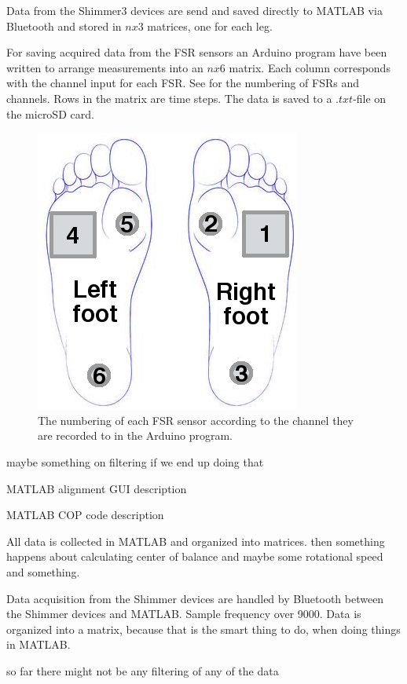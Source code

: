 Data from the Shimmer3 devices are send and saved directly to MATLAB via Bluetooth and stored in $nx3$ matrices, one for each leg.

For saving acquired data from the FSR sensors an Arduino program have been written to arrange measurements into an $nx6$ matrix. Each column corresponds with the channel input for each FSR. See  for the numbering of FSRs and channels. Rows in the matrix are time steps. The data is saved to a $.txt$-file on the microSD card. 

\begin{figure}[H]
	\includegraphics[width=.6\textwidth]{figures/FSRNumbering}
	\caption{The numbering of each FSR sensor according to the channel they are recorded to in the Arduino program.}
	\label{fig:FSRNumbering}  %
\end{figure}

maybe something on filtering if we end up doing that

MATLAB alignment GUI description

MATLAB COP code description





All data is collected in MATLAB and organized into matrices. then something happens about calculating center of balance and maybe some rotational speed and something. 

Data acquisition from the Shimmer devices are handled by Bluetooth between the Shimmer devices and MATLAB. Sample frequency over 9000. Data is organized into a matrix, because that is the smart thing to do, when doing things in MATLAB.



so far there might not be any filtering of any of the data


